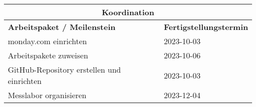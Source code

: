 \begin{table}[h]
	\begin{tabular}{|p{.6\linewidth}|p{.3\linewidth}|}
		\multicolumn{2}{c}{\textbf{Koordination}} \\ \hline
		\textbf{Arbeitspaket / Meilenstein} & \textbf{Fertigstellungstermin} \\ \hline
		monday.com einrichten & 2023-10-03 \\ \hline
		Arbeitspakete zuweisen & 2023-10-06 \\ \hline
		GitHub-Repository erstellen und einrichten & 2023-10-03 \\ \hline
		Messlabor organisieren & 2023-12-04 \\ \hline
	\end{tabular}
\end{table}

